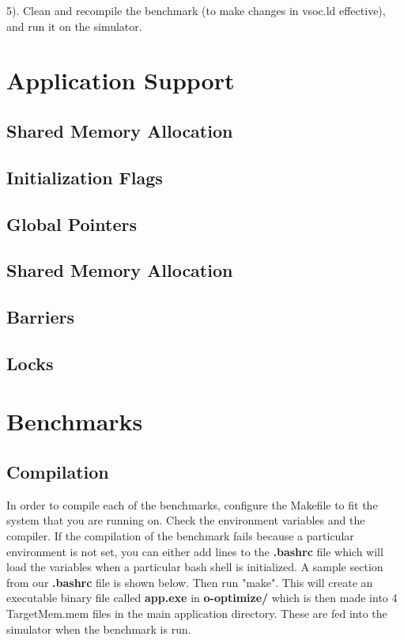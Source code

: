 \documentclass{article}
\begin{document}
\vspace{2mm}
5). Clean and recompile the benchmark (to make changes in vsoc.ld effective), and run it on the simulator.

\newpage

\section{Application Support}

\subsection{Shared Memory Allocation}
\subsection{Initialization Flags}
\subsection{Global Pointers}
\subsection{Shared Memory Allocation}
\subsection{Barriers}
\subsection{Locks}

\newpage
\section{Benchmarks}
\subsection{Compilation}

In order to compile each of the benchmarks, configure the Makefile to fit the system that you 
are running on. Check the environment variables and the compiler. If the compilation of the 
benchmark fails because a particular environment is not set, you can either add lines to the 
\textbf{.bashrc} file which will load the variables when a particular bash shell is initialized.  A sample section 
from our \textbf{.bashrc} file is shown below. Then run 
"make". This will create an executable binary file called \textbf{app.exe} in \textbf{o-optimize/} which is then 
made into 4 TargetMem\*.mem files in the main application directory. These are 
fed into the simulator when the benchmark is run. 
\end{document}
